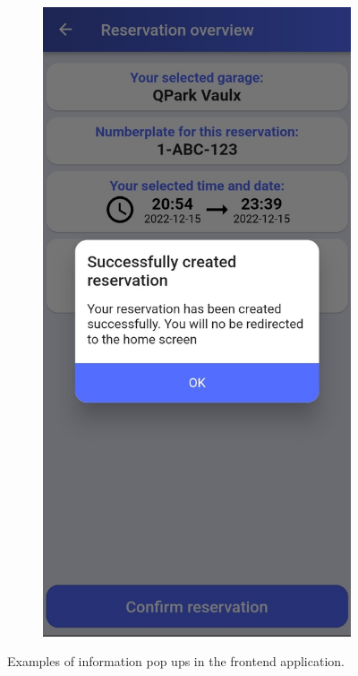 \begin{figure}[!htp]
\begin{subfigure}[b]{0.30\textwidth}
     \end{subfigure}
     \hfill
     \begin{subfigure}[b]{0.30\textwidth}
         \centering
         \includegraphics[width=\textwidth]{images/app/dialog4.jpg}
     \end{subfigure}
        \caption{Examples of information pop ups in the frontend application.}
        \label{fig:information-dialogs}
\end{figure}

\clearpage
